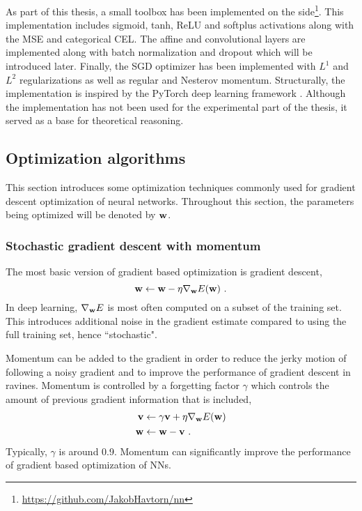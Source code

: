 As part of this thesis, a small toolbox has been implemented on the side\footnote{\url{https://github.com/JakobHavtorn/nn}}. This implementation includes sigmoid, tanh, ReLU and softplus activations along with the \gls{MSE} and categorical \gls{CEL}. The affine and convolutional layers are implemented along with batch normalization and dropout which will be introduced later. Finally, the \gls{SGD} optimizer has been implemented with $L^1$ and $L^2$ regularizations as well as regular and Nesterov momentum. Structurally, the implementation is inspired by the PyTorch deep learning framework \cite{Paszke2017}. Although the implementation has not been used for the experimental part of the thesis, it served as a base for theoretical reasoning.


\subsection{Optimization algorithms}
This section introduces some optimization techniques commonly used for gradient descent optimization of neural networks. Throughout this section, the parameters being optimized will be denoted by ${\mathbf{w}}$.

\subsubsection{Stochastic gradient descent with momentum}\label{sec: Neural networks training: Optimization: SGD with momentum}
The most basic version of gradient based optimization is gradient descent,
\begin{equation}
    {\mathbf{w}} \leftarrow {\mathbf{w}} - \eta\nabla_{\mathbf{w}} E({\mathbf{w}}) \ .
\end{equation}
In deep learning, $\nabla_{\mathbf{w}} E$ is most often computed on a subset of the training set. This introduces additional noise in the gradient estimate compared to using the full training set, hence ``stochastic".

Momentum \cite{Qian1999} can be added to the gradient in order to reduce the jerky motion of following a noisy gradient and to improve the performance of gradient descent in ravines. Momentum is controlled by a forgetting factor $\gamma$ which controls the amount of previous gradient information that is included,
\begin{equation}
    \begin{aligned}
        {\mathbf{v}} & \leftarrow \gamma{\mathbf{v}} + \eta\nabla_{\mathbf{w}} E({\mathbf{w}})\\
        {\mathbf{w}} & \leftarrow {\mathbf{w}} - {\mathbf{v}} \ .
    \end{aligned}
\end{equation}
Typically, $\gamma$ is around 0.9. Momentum can significantly improve the performance of gradient based optimization of \glspl{NN}.

